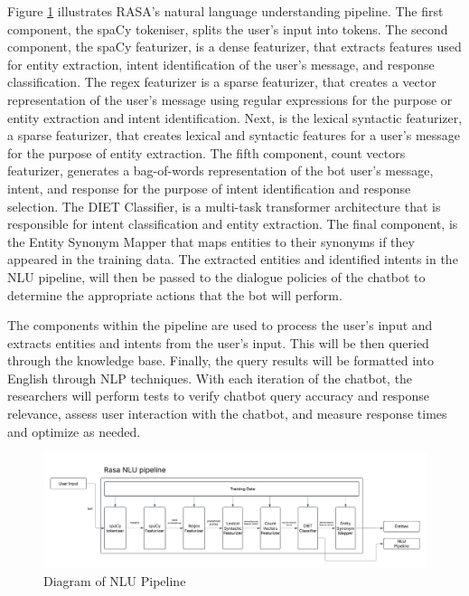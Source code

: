     Figure \ref{fig:nlu pipeline} illustrates RASA's natural language understanding pipeline. The first component, the spaCy tokeniser, splits the user's input into tokens. The second component, the spaCy featurizer, is a dense featurizer, that extracts features used for entity extraction, intent identification of the user's message, and response classification. The regex featurizer is a sparse featurizer, that creates a vector representation of the user's message using regular expressions for the purpose or entity extraction and intent identification. Next, is the lexical syntactic featurizer, a sparse featurizer, that creates lexical and syntactic features for a user's message for the purpose of entity extraction. The fifth component, count vectors featurizer, generates a bag-of-words representation of the bot user's message, intent, and response for the purpose of intent identification and response selection. The DIET Classifier, is a multi-task transformer architecture that is responsible for intent classification and entity extraction. The final component, is the Entity Synonym Mapper that maps entities to their synonyms if they appeared in the training data. The extracted entities and identified intents in the NLU pipeline, will then be passed to the dialogue policies of the chatbot to determine the appropriate actions that the bot will perform. 
    
    The components within the pipeline are used to process the user's input and extracts entities and intents from the user's input. This will be then queried through the knowledge base. Finally, the query results will be formatted into English through NLP techniques. With each iteration of the chatbot, the researchers will perform tests to verify chatbot query accuracy and response relevance, assess user interaction with the chatbot, and measure response times and optimize as needed.

\begin{figure}[H]
    \centering
    \includegraphics[width=\linewidth]{figures/NLU Pipeline.png}
    \caption{Diagram of NLU Pipeline}
    \label{fig:nlu pipeline}
\end{figure}

